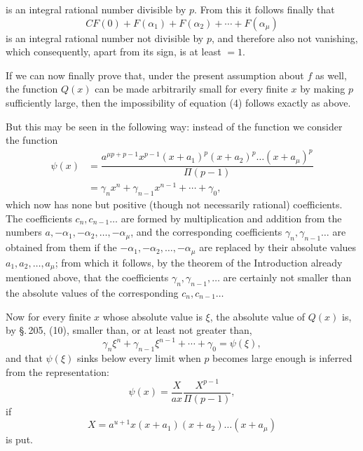 is an integral rational number divisible by $p$. From this it follows finally that
\[
CF(0) + F(\alpha_1) + F(\alpha_2) + \cdots + F(\alpha_\mu)
\]
is an integral rational number not divisible by $p$, and therefore also not vanishing, which consequently, apart from its sign, is at least $=1$.

If we can now finally prove that, under the present assumption about $f$ as well, the function $Q(x)$ can be made arbitrarily small for every finite $x$ by making $p$ sufficiently large, then the impossibility of equation (4) follows exactly as above.

But this may be seen in the following way: instead of the function
we consider the function
\[
\begin{aligned}
\psi(x) &= \dfrac{a^{\mu p+p-1}x^{p-1}(x+a_1)^p(x+a_2)^p\ldots(x+a_\mu)^p}{\Pi(p-1)} \\
&= \gamma_nx^n + \gamma_{n-1}x^{n-1} + \cdots + \gamma_0,
\end{aligned}
\]
which now has none but positive (though not necessarily rational) coefficients. The coefficients $c_n,c_{n-1}\ldots$ are formed by multiplication and addition from the numbers $a,-\alpha_1,-\alpha_2,\ldots,-\alpha_\mu$, and the corresponding coefficients $\gamma_n,\gamma_{n-1}\ldots$ are obtained from them if the $-\alpha_1,-\alpha_2,\ldots,-\alpha_\mu$ are replaced by their absolute values $a_1,a_2,\ldots,a_\mu$; from which it follows, by the theorem of the Introduction already mentioned above, that the coefficients $\gamma_n,\gamma_{n-1},\ldots$ are certainly not smaller than the absolute values of the corresponding $c_n,c_{n-1}\ldots$

Now for every finite $x$ whose absolute value is $\xi$, the absolute value of $Q(x)$ is, by \S.\,205, (10), smaller than, or at least not greater than,
\[
\gamma_n\xi^n + \gamma_{n-1}\xi^{n-1} + \cdots + \gamma_0 = \psi(\xi),
\]
and that $\psi(\xi)$ sinks below every limit when $p$ becomes large enough is inferred from the representation:
\[
\psi(x) = \dfrac{X}{ax}\dfrac{X^{p-1}}{\Pi(p-1)},
\]
if
\[
X = a^{u+1}x(x+a_1)(x+a_2)\ldots(x+a_\mu)
\]
is put.
